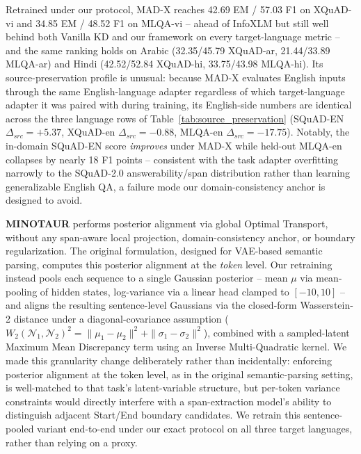 \documentclass[11pt]{article}
\begin{document}
Retrained under our protocol, MAD-X reaches 42.69 EM / 57.03 F1 on XQuAD-vi and 34.85 EM / 48.52 F1 on MLQA-vi -- ahead of InfoXLM but still well behind both Vanilla KD and our framework on every target-language metric -- and the same ranking holds on Arabic (32.35/45.79 XQuAD-ar, 21.44/33.89 MLQA-ar) and Hindi (42.52/52.84 XQuAD-hi, 33.75/43.98 MLQA-hi). Its source-preservation profile is unusual: because MAD-X evaluates English inputs through the same English-language adapter regardless of which target-language adapter it was paired with during training, its English-side numbers are identical across the three language rows of Table~\ref{tab:source_preservation} (SQuAD-EN $\Delta_{src}=+5.37$, XQuAD-en $\Delta_{src}=-0.88$, MLQA-en $\Delta_{src}=-17.75$). Notably, the in-domain SQuAD-EN score \emph{improves} under MAD-X while held-out MLQA-en collapses by nearly 18 F1 points -- consistent with the task adapter overfitting narrowly to the SQuAD-2.0 answerability/span distribution rather than learning generalizable English QA, a failure mode our domain-consistency anchor is designed to avoid.

\textbf{MINOTAUR}
\label{sec:appendix_minotaur}
\citep{sherborne-etal-2023-optimal} performs posterior alignment via global Optimal Transport, without any span-aware local projection, domain-consistency anchor, or boundary regularization. The original formulation, designed for VAE-based semantic parsing, computes this posterior alignment at the \emph{token} level. Our retraining instead pools each sequence to a single Gaussian posterior -- mean $\mu$ via mean-pooling of hidden states, log-variance via a linear head clamped to $[-10, 10]$ -- and aligns the resulting sentence-level Gaussians via the closed-form Wasserstein-2 distance under a diagonal-covariance assumption ($W_2(\mathcal{N}_1,\mathcal{N}_2)^2 = \|\mu_1-\mu_2\|^2 + \|\sigma_1-\sigma_2\|^2$), combined with a sampled-latent Maximum Mean Discrepancy term using an Inverse Multi-Quadratic kernel. We made this granularity change deliberately rather than incidentally: enforcing posterior alignment at the token level, as in the original semantic-parsing setting, is well-matched to that task's latent-variable structure, but per-token variance constraints would directly interfere with a span-extraction model's ability to distinguish adjacent Start/End boundary candidates. We retrain this sentence-pooled variant end-to-end under our exact protocol on all three target languages, rather than relying on a proxy.
\end{document}
